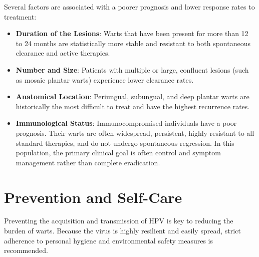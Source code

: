 Several factors are associated with a poorer prognosis and lower response rates to treatment:
\begin{itemize}
    \item \textbf{Duration of the Lesions}: Warts that have been present for more than 12 to 24 months are statistically more stable and resistant to both spontaneous clearance and active therapies.
    \item \textbf{Number and Size}: Patients with multiple or large, confluent lesions (such as mosaic plantar warts) experience lower clearance rates.
    \item \textbf{Anatomical Location}: Periungual, subungual, and deep plantar warts are historically the most difficult to treat and have the highest recurrence rates.
    \item \textbf{Immunological Status}: Immunocompromised individuals have a poor prognosis. Their warts are often widespread, persistent, highly resistant to all standard therapies, and do not undergo spontaneous regression. In this population, the primary clinical goal is often control and symptom management rather than complete eradication.
\end{itemize}

\section*{Prevention and Self-Care}
Preventing the acquisition and transmission of HPV is key to reducing the burden of warts. Because the virus is highly resilient and easily spread, strict adherence to personal hygiene and environmental safety measures is recommended.

